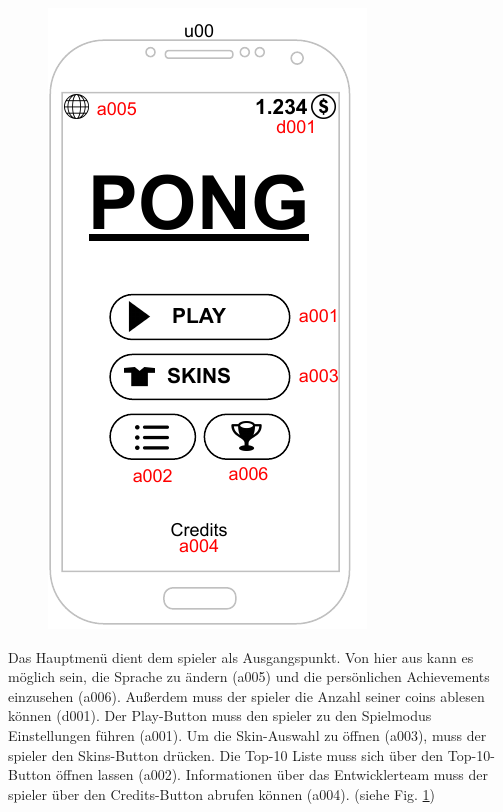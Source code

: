 \begin{figure}[h!]
    \begin{center}
    \includegraphics[scale=1.4]{diagramme/pdf/Mockup-u00.pdf}
    \end{center}
    \label{fig:dia:u00}
\end{figure}

Das Hauptmenü dient dem \gls{spieler} als Ausgangspunkt. Von hier aus kann es möglich sein, die Sprache zu ändern (a005) und die persönlichen Achievements einzusehen (a006). 
Außerdem muss der \gls{spieler} die Anzahl seiner \glspl{coin} ablesen können (d001). Der Play-Button muss den \gls{spieler} zu den Spielmodus Einstellungen führen (a001).
Um die Skin-Auswahl zu öffnen (a003), muss der \gls{spieler} den Skins-Button drücken. Die Top-10 Liste muss sich über den Top-10-Button öffnen lassen (a002). Informationen über das Entwicklerteam muss der \gls{spieler} 
über den Credits-Button abrufen können (a004).
(siehe Fig. \ref{fig:dia:u00})

\clearpage

